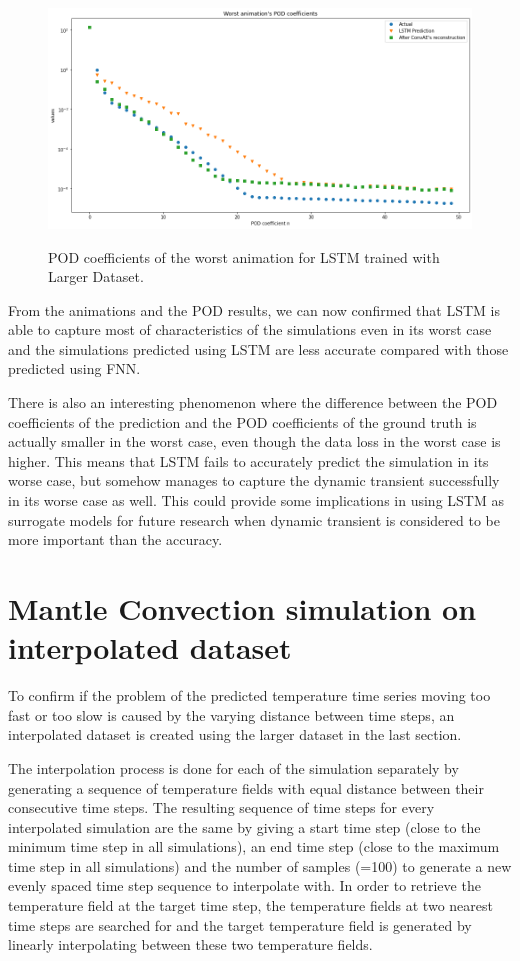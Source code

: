 \begin{figure}[H]
    \centering
    \caption{POD coefficients of the worst animation for LSTM trained with Larger Dataset.}
    \includegraphics[scale=0.4]{figures/mantle_convection_images/larger_dataset/LSTM_Worst_POD.png}
    \label{figure:LSTM_larger_worst_POD}
\end{figure}

From the animations and the POD results, we can now confirmed that LSTM is able to capture most of characteristics of the simulations even in its worst case and the simulations predicted using LSTM are less accurate compared with those predicted using FNN. 

There is also an interesting phenomenon where the difference between the POD coefficients of the prediction and the POD coefficients of the ground truth is actually smaller in the worst case, even though the data loss in the worst case is higher. This means that LSTM fails to accurately predict the simulation in its worse case, but somehow manages to capture the dynamic transient successfully in its worse case as well. This could provide some implications in using LSTM as surrogate models for future research when dynamic transient is considered to be more important than the accuracy.


\section{Mantle Convection simulation on interpolated dataset}
\label{sec:mc_interpolated}

To confirm if the problem of the predicted temperature time series moving too fast or too slow is caused by the varying distance between time steps, an interpolated dataset is created using the larger dataset in the last section.

The interpolation process is done for each of the simulation separately by generating a sequence of temperature fields with equal distance between their consecutive time steps. The resulting sequence of time steps for every interpolated simulation are the same by giving a start time step (close to the minimum time step in all simulations), an end time step (close to the maximum time step in all simulations) and the number of samples (=100) to generate a new evenly spaced time step sequence to interpolate with. In order to retrieve the temperature field at the target time step, the temperature fields at two nearest time steps are searched for and the target temperature field is generated by linearly interpolating between these two temperature fields.

